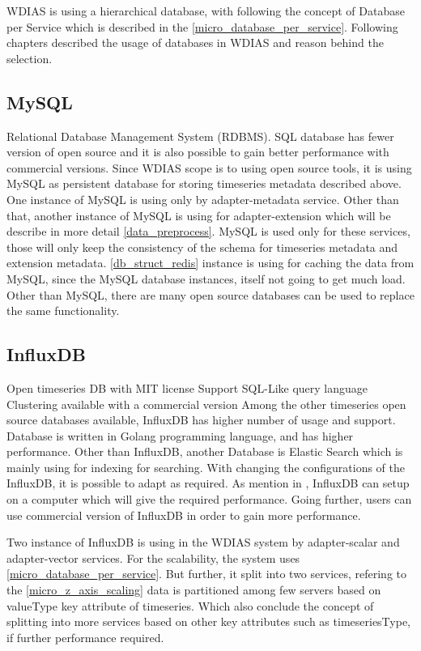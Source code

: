 WDIAS is using a hierarchical database, with following the concept of Database per Service which is described in the \ref{micro_database_per_service}.
Following chapters described the usage of databases in WDIAS and reason behind the selection.

\subsection{MySQL}
\label{sub:mysql}
Relational Database Management System (RDBMS).
SQL database has fewer version of open source and it is also possible to gain better performance with commercial versions. 
Since WDIAS scope is to using open source tools, it is using MySQL as persistent database for storing timeseries metadata described above.
One instance of MySQL is using only by adapter-metadata service.
Other than that, another instance of MySQL is using for adapter-extension which will be describe in more detail \ref{data_preprocess}.
MySQL is used only for these services, those will only keep the consistency of the schema for timeseries metadata and extension metadata.
\ref{db_struct_redis} instance is using for caching the data from MySQL, since the MySQL database instances, itself not going to get much load.
Other than MySQL, there are many open source databases can be used to replace the same functionality.

\subsection{InfluxDB} \cite{influxdbInfluxDBDocumentation}
\label{sub:influxdb}
Open timeseries DB with MIT license
Support SQL-Like query language
Clustering available with a commercial version
Among the other timeseries open source databases available, InfluxDB has higher number of usage and support. Database is written in Golang programming language,
and has higher performance. Other than InfluxDB, another Database is Elastic Search which is mainly using for indexing for searching.
With changing the configurations of the InfluxDB, it is possible to adapt as required. As mention in \cite{influxdbInfluxDBDocumentation}, 
InfluxDB can setup on a computer which will give the required performance. Going further, users can use commercial version of InfluxDB in order to gain more performance.

Two instance of InfluxDB is using in the WDIAS system by adapter-scalar and adapter-vector services. For the scalability, the system uses \ref{micro_database_per_service}.
But further, it split into two services, refering to the \ref{micro_z_axis_scaling} data is partitioned among few servers based on valueType key attribute of timeseries.
Which also conclude the concept of splitting into more services based on other key attributes such as timeseriesType, if further performance required.

